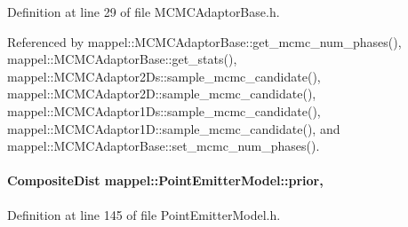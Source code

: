 Definition at line 29 of file M\+C\+M\+C\+Adaptor\+Base.\+h.



Referenced by mappel\+::\+M\+C\+M\+C\+Adaptor\+Base\+::get\+\_\+mcmc\+\_\+num\+\_\+phases(), mappel\+::\+M\+C\+M\+C\+Adaptor\+Base\+::get\+\_\+stats(), mappel\+::\+M\+C\+M\+C\+Adaptor2\+Ds\+::sample\+\_\+mcmc\+\_\+candidate(), mappel\+::\+M\+C\+M\+C\+Adaptor2\+D\+::sample\+\_\+mcmc\+\_\+candidate(), mappel\+::\+M\+C\+M\+C\+Adaptor1\+Ds\+::sample\+\_\+mcmc\+\_\+candidate(), mappel\+::\+M\+C\+M\+C\+Adaptor1\+D\+::sample\+\_\+mcmc\+\_\+candidate(), and mappel\+::\+M\+C\+M\+C\+Adaptor\+Base\+::set\+\_\+mcmc\+\_\+num\+\_\+phases().

\paragraph[{\texorpdfstring{prior}{prior}}]{\setlength{\rightskip}{0pt plus 5cm}Composite\+Dist mappel\+::\+Point\+Emitter\+Model\+::prior\hspace{0.3cm}{\ttfamily [protected]}, {\ttfamily [inherited]}}\hypertarget{classmappel_1_1PointEmitterModel_a393839f8eb1dd3d61c9369377742ba0e}{}\label{classmappel_1_1PointEmitterModel_a393839f8eb1dd3d61c9369377742ba0e}


Definition at line 145 of file Point\+Emitter\+Model.\+h.



